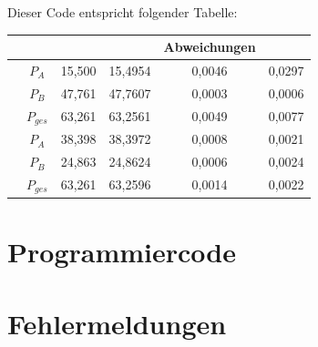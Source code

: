 \documentclass[
12pt,
a4paper,
headings=small,                    %
bibliography=totoc,                %
listof=totoc,                      %
parskip=half*,                     %
]{scrartcl}                        %
\renewcommand{\arraystretch}{1.15}
\begin{document}
	Dieser Code entspricht folgender Tabelle:
		\begin{table}[H]
		\centering
		\renewcommand{\arraystretch}{2} %
		\setlength{\tabcolsep}{0.3em} %
		
		\begin{tabular}{|c|c|S[ table-format = 2.3]|S[ table-format = 2.3]|
				S[ table-format = 1.4]|S[ table-format = 1.4]|}
			\hline
			& {} & {} &{Abweichungen} 
			&{} \\ \hline
			&  $P_A$ & 15,500 & 15,4954 & 0,0046 & 0,0297 \\  
			& $P_B$ & 47,761 & 47,7607 & 0,0003 & 0,0006 \\  
			& $P_{ges}$ & 63,261 & 63,2561 & 0,0049 & 0,0077 \\ \hline
			& $P_A$ & 38,398 & 38,3972 & 0,0008 & 0,0021 \\  
			& $P_B$ & 24,863 & 24,8624 & 0,0006 & 0,0024 \\  
			& $P_{ges}$ & 63,261 & 63,2596 & 0,0014 & 0,0022 \\ \hline
		\end{tabular}
	\end{table}




	\newpage
	\section{Programmiercode}
	
	
	
	
	\newpage
	\section{Fehlermeldungen}
	
	
	\newpage
	\printbibliography
	
\end{document}
